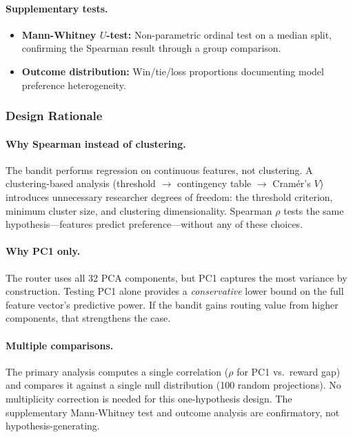 \paragraph{Supplementary tests.}
\begin{itemize}[leftmargin=*,noitemsep,topsep=0pt]
    \item \textbf{Mann-Whitney $U$-test:} Non-parametric ordinal test on a
    median split, confirming the Spearman result through a group comparison.
    \item \textbf{Outcome distribution:} Win/tie/loss proportions documenting
    model preference heterogeneity.
\end{itemize}

\subsubsection{Design Rationale}

\paragraph{Why Spearman instead of clustering.}
The bandit performs regression on continuous features, not clustering.  A
clustering-based analysis (threshold $\to$ contingency table $\to$ Cram\'er's
$V$) introduces unnecessary researcher degrees of freedom: the threshold
criterion, minimum cluster size, and clustering dimensionality.  Spearman
$\rho$ tests the same hypothesis---features predict preference---without any
of these choices.

\paragraph{Why PC1 only.}
The router uses all 32 PCA components, but PC1 captures the most variance by
construction.  Testing PC1 alone provides a \emph{conservative} lower bound on
the full feature vector's predictive power.  If the bandit gains routing value
from higher components, that strengthens the case.

\paragraph{Multiple comparisons.}
The primary analysis computes a single correlation ($\rho$ for PC1 vs.\ reward
gap) and compares it against a single null distribution (100 random
projections).  No multiplicity correction is needed for this one-hypothesis
design.  The supplementary Mann-Whitney test and outcome analysis are
confirmatory, not hypothesis-generating.

